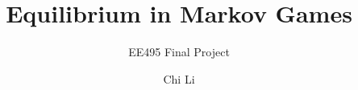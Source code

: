 \documentclass[aspectratio=169,xcolor=dvipsnames]{beamer}
\title{Equilibrium in Markov Games}
\subtitle{EE495 Final Project}
\author{Chi Li}
\begin{document}
\begin{frame}
    \titlepage
\end{frame}


\end{document}
